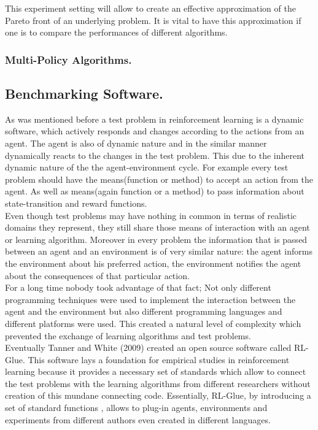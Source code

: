 This experiment setting will allow to create an effective approximation of the Pareto front of an underlying problem. It is vital to have this approximation if one is to compare the performances of different algorithms.

\subsubsection{Multi-Policy Algorithms.}

\subsection{Benchmarking Software.}
As was mentioned before a test problem in reinforcement learning is a dynamic software, which actively responds and changes according to the actions from an agent. The agent is also of dynamic nature and in the similar manner dynamically reacts to the changes in the test problem. This due to the inherent dynamic nature of the the agent-environment cycle. For example every test problem should have the means(function or method) to accept an action from the agent. As well as means(again function or a method) to pass information about state-transition and reward functions. \\

Even though test problems may have nothing in common in terms of realistic domains they represent, they still share those means of interaction with an agent or learning algorithm. Moreover in every problem the information that is passed between an agent and an environment is of very similar nature: the agent informs the environment about his preferred action, the environment notifies the agent about the consequences of that particular action. \\

For a long time nobody took advantage of that fact; Not only different programming techniques were used to implement the interaction between the agent and the environment but also different programming languages and different platforms were used. This created a natural level of complexity which prevented the exchange of learning algorithms and test problems. \\

Eventually Tanner and White (2009)\cite{tanner2009rl} created an open source software called RL-Glue. This software lays a foundation for empirical studies in reinforcement learning because it provides a necessary set of standards which allow to connect the test problems with the learning algorithms from different researchers without creation of this mundane connecting code. Essentially, RL-Glue, by introducing a set of standard functions , allows to plug-in agents, environments and experiments from different authors even created in different languages. \\

